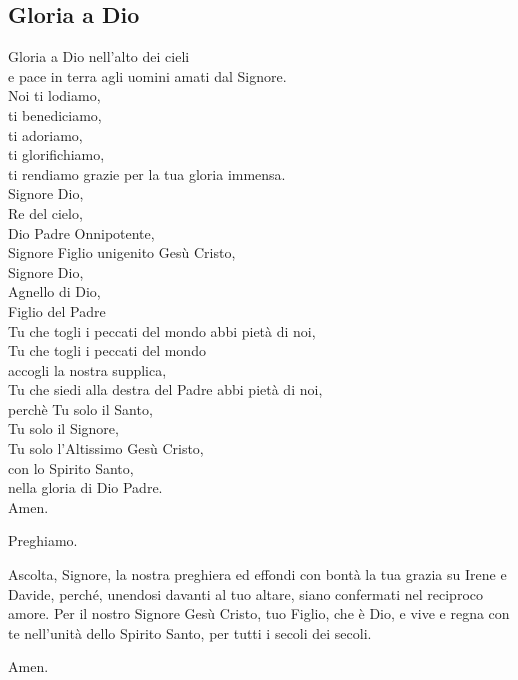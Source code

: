 
\subsection*{Gloria a Dio}

\begin{dialoghi}
	\item[\tutti] Gloria a Dio nell'alto dei cieli\\ 
	e pace in terra agli uomini amati dal Signore.\\ 
	Noi ti lodiamo,\\ 
	ti benediciamo,\\ 
	ti adoriamo,\\ 
	ti glorifichiamo,\\ 
	ti rendiamo grazie per la tua gloria immensa.\\ 
	Signore Dio,\\ 
	Re del cielo,\\ 
	Dio Padre Onnipotente,\\ 
	Signore Figlio unigenito Gesù Cristo,\\ 
	Signore Dio,\\ 
	Agnello di Dio,\\ 
	Figlio del Padre\\ 
	Tu che togli i peccati del mondo abbi pietà di noi,\\ 
	Tu che togli i peccati del mondo\\ 
	accogli la nostra supplica,\\ 
	Tu che siedi alla destra del Padre abbi pietà di noi,\\ 
	perchè Tu solo il Santo,\\ 
	Tu solo il Signore,\\ 
	Tu solo l'Altissimo Gesù Cristo,\\ 
	con lo Spirito Santo,\\ 
	nella gloria di Dio Padre.\\ 
	Amen.
\end{dialoghi}



\begin{dialoghi}
	\item[\sacerdote] Preghiamo.

	Ascolta, Signore, la nostra preghiera ed effondi con bontà la tua grazia su Irene e Davide, perché, unendosi davanti al tuo altare, siano confermati nel reciproco amore. Per il nostro Signore Gesù Cristo, tuo Figlio, che è Dio, e vive e regna con te nell'unità dello Spirito Santo, per tutti i secoli dei secoli.
	\item[\assemblea] Amen.
\end{dialoghi}

